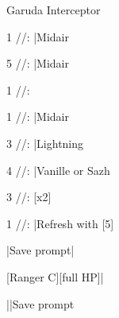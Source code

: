 \begin{fight}{Garuda Interceptor}
	\item [1] \com/\rav/\rav: |Midair
	\item [5] \com/\rav/\rav: \to{}\to{}|Midair
	\item [1] \com/\rav/\rav: 
	\item {}
	\item [1] \com/\rav/\rav: |Midair
	\item [3] \rav/\rav/\rav: |Lightning
	\item [4] \rav/\rav/\rav: |Vanille or Sazh
	\item [3] \rav/\rav/\rav: [x2]
	\item [1] \com/\rav/\rav: |Refresh with [5]
	\item \skip|Save prompt|\skip
\end{fight}

\begin{mainlist}
	\item {} [Ranger C]\to{}[full HP]|\skip
	\item {} \to{}\to{}||Save prompt
\end{mainlist}
